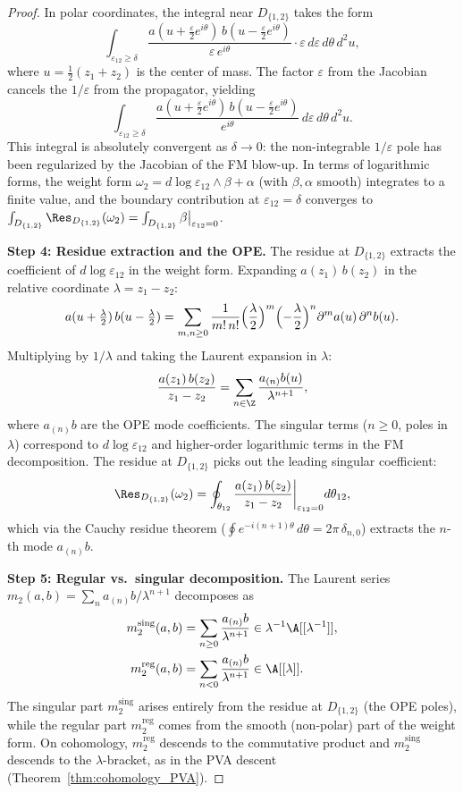 \begin{proof}
In polar coordinates, the integral near $D_{\{1,2\}}$ takes the form
\[
\int_{\varepsilon_{12} \geq \delta} \frac{a(u + \tfrac{\varepsilon}{2}e^{i\theta})\, b(u - \tfrac{\varepsilon}{2}e^{i\theta})}{\varepsilon\, e^{i\theta}} \cdot \varepsilon\, d\varepsilon\, d\theta\, d^2u,
\]
where $u = \frac{1}{2}(z_1 + z_2)$ is the center of mass. The factor $\varepsilon$ from the Jacobian cancels the $1/\varepsilon$ from the propagator, yielding
\[
\int_{\varepsilon_{12} \geq \delta} \frac{a(u + \tfrac{\varepsilon}{2}e^{i\theta})\, b(u - \tfrac{\varepsilon}{2}e^{i\theta})}{e^{i\theta}} \, d\varepsilon\, d\theta\, d^2u.
\]
This integral is absolutely convergent as $\delta \to 0$: the non-integrable $1/\varepsilon$ pole has been regularized by the Jacobian of the FM blow-up. In terms of logarithmic forms, the weight form $\omega_2 = d\log\varepsilon_{12} \wedge \beta + \alpha$ (with $\beta, \alpha$ smooth) integrates to a finite value, and the boundary contribution at $\varepsilon_{12} = \delta$ converges to $\int_{D_{\{1,2\}}} \Res_{D_{\{1,2\}}}(\omega_2) = \int_{D_{\{1,2\}}} \beta\big|_{\varepsilon_{12}=0}$.

\textbf{Step 4: Residue extraction and the OPE.}
The residue at $D_{\{1,2\}}$ extracts the coefficient of $d\log\varepsilon_{12}$ in the weight form. Expanding $a(z_1)\, b(z_2)$ in the relative coordinate $\lambda = z_1 - z_2$:
\[
a(u + \tfrac{\lambda}{2})\, b(u - \tfrac{\lambda}{2}) = \sum_{m,n \geq 0} \frac{1}{m!\, n!} \Bigl(\frac{\lambda}{2}\Bigr)^m \Bigl(-\frac{\lambda}{2}\Bigr)^n \partial^m a(u)\, \partial^n b(u).
\]
Multiplying by $1/\lambda$ and taking the Laurent expansion in $\lambda$:
\[
\frac{a(z_1)\, b(z_2)}{z_1 - z_2} = \sum_{n \in \Z} \frac{a_{(n)} b(u)}{\lambda^{n+1}},
\]
where $a_{(n)} b$ are the OPE mode coefficients. The singular terms ($n \geq 0$, poles in $\lambda$) correspond to $d\log\varepsilon_{12}$ and higher-order logarithmic terms in the FM decomposition. The residue at $D_{\{1,2\}}$ picks out the leading singular coefficient:
\[
\Res_{D_{\{1,2\}}}(\omega_2) = \oint_{\theta_{12}} \frac{a(z_1)\, b(z_2)}{z_1 - z_2}\bigg|_{\varepsilon_{12} = 0} d\theta_{12},
\]
which via the Cauchy residue theorem ($\oint e^{-i(n+1)\theta}\, d\theta = 2\pi\, \delta_{n,0}$) extracts the $n$-th mode $a_{(n)} b$.

\textbf{Step 5: Regular vs.\ singular decomposition.}
The Laurent series $m_2(a,b) = \sum_n a_{(n)} b / \lambda^{n+1}$ decomposes as
\begin{align*}
m_2^{\mathrm{sing}}(a,b) &= \sum_{n \geq 0} \frac{a_{(n)} b}{\lambda^{n+1}} \in \lambda^{-1}\A[[\lambda^{-1}]], \\
m_2^{\mathrm{reg}}(a,b) &= \sum_{n < 0} \frac{a_{(n)} b}{\lambda^{n+1}} \in \A[[\lambda]].
\end{align*}
The singular part $m_2^{\mathrm{sing}}$ arises entirely from the residue at $D_{\{1,2\}}$ (the OPE poles), while the regular part $m_2^{\mathrm{reg}}$ comes from the smooth (non-polar) part of the weight form. On cohomology, $m_2^{\mathrm{reg}}$ descends to the commutative product and $m_2^{\mathrm{sing}}$ descends to the $\lambda$-bracket, as in the PVA descent (Theorem~\ref{thm:cohomology_PVA}).


\end{proof}
